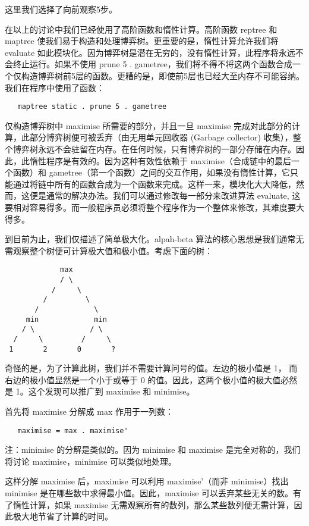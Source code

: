 \documentclass[12pt]{article}
\begin{document}
这里我们选择了向前观察5步。

在以上的讨论中我们已经使用了高阶函数和惰性计算。高阶函数 reptree 和 maptree 使我们易于构造和处理博弈树。更重要的是，惰性计算允许我们将 evaluate 如此模块化。因为博弈树是潜在无穷的，没有惰性计算，此程序将永远不会终止运行。如果不使用 prune 5 . gametree，我们将不得不将这两个函数合成一个仅构造博弈树前5层的函数。更糟的是，即使前5层也已经大至内存不可能容纳。我们在程序中使用了函数：

\begin{verbatim}
   maptree static . prune 5 . gametree
\end{verbatim}

仅构造博弈树中 maximise 所需要的部分，并且一旦 maximise 完成对此部分的计算，此部分博弈树便可被丢弃（由无用单元回收器 (Garbage collector) 收集），整个博弈树永远不会驻留在内存。在任何时候，只有博弈树的一部分存储在内存。因此，此惰性程序是有效的。因为这种有效性依赖于 maximise（合成链中的最后一个函数）和 gametree（第一个函数）之间的交互作用，如果没有惰性计算，它只能通过将链中所有的函数合成为一个函数来完成。这样一来，模块化大大降低，然而，这便是通常的解决办法。我们可以通过修改每一部分来改进算法 evaluate, 这要相对容易得多。而一般程序员必须将整个程序作为一个整体来修改，其难度要大得多。

到目前为止，我们仅描述了简单极大化。alpah-beta 算法的核心思想是我们通常无需观察整个树便可计算极大值和极小值。考虑下面的树：

\begin{verbatim}
             max
             / \
           /     \
         /         \
       /             \
     min             min
    / \             / \
  /     \         /     \
 1       2       0       ?
\end{verbatim}

奇怪的是，为了计算此树，我们并不需要计算问号的值。左边的极小值是 1， 而右边的极小值显然是一个小于或等于 0 的值。因此，这两个极小值的极大值必然是 1。这个发现可以推广到 maximise 和 minimise。

首先将 maximise 分解成 max 作用于一列数：
\begin{verbatim}
   maximise = max . maximise'
\end{verbatim}

注：minimise 的分解是类似的。因为 minimise 和 maximise 是完全对称的，我们将讨论 maximise，minimise 可以类似地处理。

这样分解 maximise 后，maximise 可以利用 maximise'（而非 minimise）找出 minimise 是在哪些数中求得最小值。因此，maximise 可以丢弃某些无关的数。有了惰性计算，如果 maximise 无需观察所有的数列，那么某些数列便无需计算，因此极大地节省了计算的时间。
\end{document}
